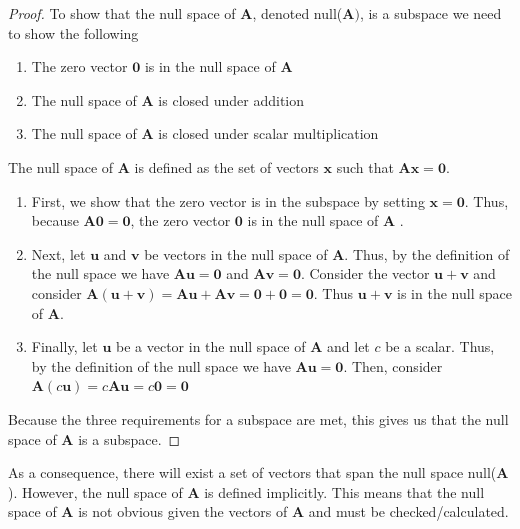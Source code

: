\documentclass[
]{book}
\theoremstyle{definition}
\theoremstyle{definition}
\theoremstyle{definition}
\theoremstyle{definition}
\theoremstyle{remark}
\begin{document}
\begin{proof}
To show that the null space of \(\mathbf{A}\), denoted null(\(\mathbf{A})\), is a subspace we need to show the following

\begin{enumerate}
\def\labelenumi{\arabic{enumi})}
\item
  The zero vector \(\mathbf{0}\) is in the null space of \(\mathbf{A}\)
\item
  The null space of \(\mathbf{A}\) is closed under addition
\item
  The null space of \(\mathbf{A}\) is closed under scalar multiplication
\end{enumerate}

The null space of \(\mathbf{A}\) is defined as the set of vectors \(\mathbf{x}\) such that \(\mathbf{A} \mathbf{x} = \mathbf{0}\).

\begin{enumerate}
\def\labelenumi{\arabic{enumi})}
\item
  First, we show that the zero vector is in the subspace by setting \(\mathbf{x} = \mathbf{0}\). Thus, because \(\mathbf{A} \mathbf{0} = \mathbf{0}\), the zero vector \(\mathbf{0}\) is in the null space of \(\mathbf{A}\) .
\item
  Next, let \(\mathbf{u}\) and \(\mathbf{v}\) be vectors in the null space of \(\mathbf{A}\). Thus, by the definition of the null space we have \(\mathbf{A} \mathbf{u} = \mathbf{0}\) and \(\mathbf{A} \mathbf{v} = \mathbf{0}\). Consider the vector \(\mathbf{u} + \mathbf{v}\) and consider \(\mathbf{A} (\mathbf{u} + \mathbf{v}) = \mathbf{A} \mathbf{u} + \mathbf{A} \mathbf{v} = \mathbf{0} + \mathbf{0} = \mathbf{0}\). Thus \(\mathbf{u} + \mathbf{v}\) is in the null space of \(\mathbf{A}\).
\item
  Finally, let \(\mathbf{u}\) be a vector in the null space of \(\mathbf{A}\) and let \(c\) be a scalar. Thus, by the definition of the null space we have \(\mathbf{A} \mathbf{u} = \mathbf{0}\). Then, consider \(\mathbf{A} (c \mathbf{u}) = c \mathbf{A} \mathbf{u} = c \mathbf{0} = \mathbf{0}\)
\end{enumerate}

Because the three requirements for a subspace are met, this gives us that the null space of \(\mathbf{A}\) is a subspace.
\end{proof}

As a consequence, there will exist a set of vectors that span the null space null(\(\mathbf{A}\)). However, the null space of \(\mathbf{A}\) is defined implicitly. This means that the null space of \(\mathbf{A}\) is not obvious given the vectors of \(\mathbf{A}\) and must be checked/calculated.
\end{document}
